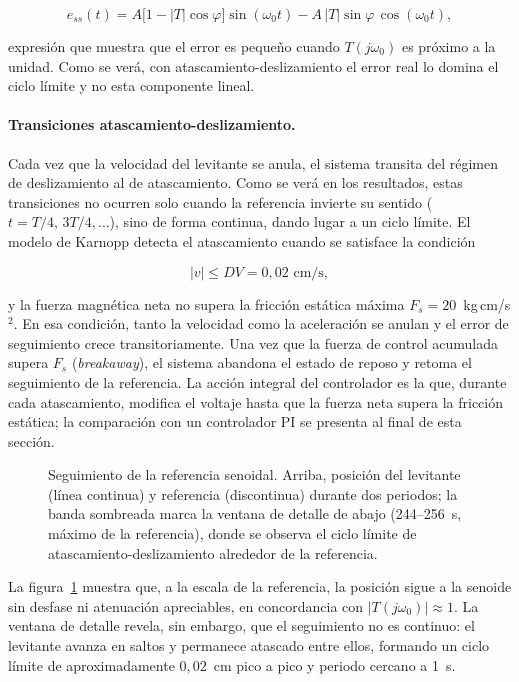 \[
  e_{ss}(t) = A\bigl[1 - |T|\cos\varphi\bigr]\sin(\omega_0 t)
              - A\,|T|\sin\varphi\,\cos(\omega_0 t),
\]

expresión que muestra que el error es pequeño cuando $T(j\omega_0)$ es próximo a la unidad. Como se verá, con atascamiento-deslizamiento el error real lo domina el ciclo límite y no esta componente lineal.

\paragraph{Transiciones atascamiento-deslizamiento.}
Cada vez que la velocidad del levitante se anula, el sistema transita del régimen de deslizamiento al de atascamiento. Como se verá en los resultados, estas transiciones no ocurren solo cuando la referencia invierte su sentido ($t = T/4,\,3T/4,\ldots$), sino de forma continua, dando lugar a un ciclo límite.
El modelo de Karnopp detecta el atascamiento cuando se satisface la condición

\[
  |v| \leq DV = 0{,}02 \text{ cm/s},
\]

y la fuerza magnética neta no supera la fricción estática máxima $F_s = 20$~kg\,cm/s$^2$.
En esa condición, tanto la velocidad como la aceleración se anulan y el error de seguimiento
crece transitoriamente.
Una vez que la fuerza de control acumulada supera $F_s$ (\emph{breakaway}), el sistema
abandona el estado de reposo y retoma el seguimiento de la referencia.
La acción integral del controlador es la que, durante cada atascamiento, modifica el voltaje hasta que la fuerza neta supera la fricción estática; la comparación con un controlador PI se presenta al final de esta sección.

\begin{figure}[ht]
    \centering
    
    \caption[Seguimiento senoidal: posición]{Seguimiento de la referencia senoidal. Arriba, posición del levitante (línea continua) y referencia (discontinua) durante dos periodos; la banda sombreada marca la ventana de detalle de abajo (244--256~s, máximo de la referencia), donde se observa el ciclo límite de atascamiento-deslizamiento alrededor de la referencia.}
    \label{fig:sen_pos}
\end{figure}

La figura~\ref{fig:sen_pos} muestra que, a la escala de la referencia, la posición sigue a la senoide sin desfase ni atenuación apreciables, en concordancia con $|T(j\omega_0)|\approx 1$. La ventana de detalle revela, sin embargo, que el seguimiento no es continuo: el levitante avanza en saltos y permanece atascado entre ellos, formando un ciclo límite de aproximadamente $0{,}02$~cm pico a pico y periodo cercano a 1~s.

